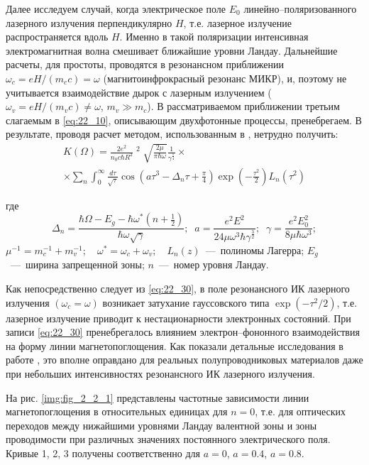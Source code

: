 Далее исследуем случай, когда электрическое поле $E_{0} $ линейно--поляризованного лазерного излучения перпендикулярно $H$, т.е. лазерное излучение распространяется вдоль $H$. Именно в такой поляризации интенсивная электромагнитная волна смешивает ближайшие уровни Ландау. Дальнейшие расчеты, для простоты, проводятся в резонансном приближении $\omega _{c} =eH/(m_{c} c)=\omega $ (магнитоинфрокрасный резонанс МИКР), и, поэтому не учитывается взаимодействие дырок с лазерным излучением ($\omega _{v} =eH/(m_{v} c)\ne \omega $, $m_{v} \gg m_{c} $). В рассматриваемом приближении третьим слагаемым в \eqref{eq:22_10}, описывающим двухфотонные процессы, пренебрегаем. В результате, проводя расчет методом, использованным в \cite{Sinyavskii1974,Sinyavskii2002}, нетрудно получить: 
\begin{multline} \label{eq:22_30} 
K(\Omega )=\frac{2e^{2} }{n_{0} c\hbar R^{2} } \mathop{\left|\frac{p_{cv} \xi _{0} }{m_{0} } \right|}\nolimits^{2} \sqrt{\frac{2\mu }{\pi \hbar \omega } } \frac{1}{\gamma ^{{\tfrac{1}{4}} } } \times \\
\times \sum _{n} \int _{0}^{\infty } \frac{d\tau }{\sqrt{\tau } } \cos \left(a\tau ^{3} -\Delta _{n} \tau +\frac{\pi }{4} \right)\exp \left(-\frac{\tau ^{2} }{2} \right)L_{n} (\tau ^{2} )
\end{multline} 

где 
\[
\Delta _{n} =\frac{\hbar \Omega -E_{g} -\hbar \omega ^{*} \left(n+{\tfrac{1}{2}} \right)}{\hbar \omega \sqrt{\gamma } } ;\; \; a=\frac{e^{2} E^{2} }{24\mu \omega ^{3} \hbar \gamma ^{{\tfrac{3}{2}} } } ;\; \; \gamma =\frac{e^{2} E_{0}^{2} }{8\mu \hbar \omega ^{3} } ;
\] 
$\mu ^{-1} =m_{c}^{-1} +m_{v}^{-1} ;$~~$\omega ^{*} =\omega _{c} +\omega _{v} ;$~~$L_{n} (z)$~---~полиномы Лагерра; $E_{g} $~---~ширина запрещенной зоны; $n$~---~номер уровня Ландау. 

\noindent Как непосредственно следует из \eqref{eq:22_30}, в поле резонансного ИК лазерного излучения $(\omega _{c} =\omega )$ возникает затухание гауссовского типа $\exp \left(-\tau ^{2} /2\right)$, т.е. лазерное излучение приводит к нестационарности электронных состояний. При записи \eqref{eq:22_30} пренебрегалось влиянием электрон--фононного взаимодействия на форму линии магнетопоглощения. Как показали детальные исследования в работе \cite{Sinyavskii1976}, это вполне оправдано для реальных полупроводниковых материалов даже при небольших интенсивностях резонансного ИК лазерного излучения. 

На рис. \ref{img:fig_2_2_1} представлены частотные зависимости линии магнетопоглощения в относительных единицах для $n=0$, т.е. для оптических переходов между нижайшими уровнями Ландау валентной зоны и зоны проводимости при различных значениях постоянного электрического поля. Кривые 1, 2, 3 получены соответственно для $a=0$, $a=0.4$, $a=0.8$.

